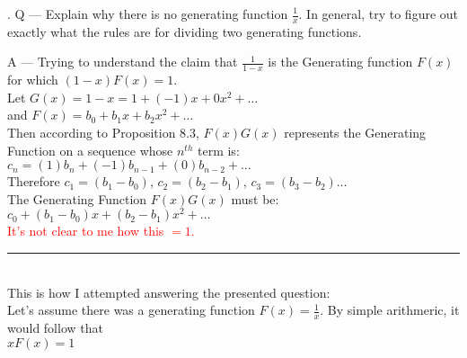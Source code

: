 \documentclass{article}
\newcounter{question}
\begin{document}
\newcommand\Que[1]{%
   \leavevmode\par
   \stepcounter{question}
   \noindent
   \thequestion. Q --- #1\par}

\newcommand\Ans[2][]{%
    \leavevmode\par\noindent
   {\leftskip37pt
    A --- \textbf{#1}#2\par}}

\Que{
    Explain why there is no generating function $ \frac{1}{x} $. 
    In general, try to figure out exactly what the rules are 
    for dividing two generating functions.
    }
\Ans{
    Trying to understand the claim  that $\frac{1}{1-x}$
    is the Generating function $F(x)$ for which $(1-x)F(x)=1$.\\

    Let $G(x) = 1-x = 1 + (-1)x + 0x^2 + \dots$\\
    
    and $F(x) = b_0 + b_1x + b_2x^2 + \dots$\\

    Then according to Proposition $8.3$, $ F(x)G(x) $
    represents the Generating Function on a sequence
    whose $n^{th}$ term is:\\

    $
    c_n = (1)b_n + (-1)b_{n-1} + (0)b_{n-2} + \dots
    $\\

    Therefore $c_1 = (b_1 - b_0)$, 
    $c_2 = (b_2 - b_1)$,
    $c_3 = (b_3 - b_2)\dots$\\

    The Generating Function $ F(x)G(x) $ must be:\\

    $
    c_0 + (b_1 - b_0)x + (b_2 - b_1)x^2 + \dots
    $\\

    \textcolor{red}{It's not clear to me how this $=1$.}\\

    \noindent\rule{11cm}{0.4pt}\\

    This is how I attempted answering the presented question:\\
    
    Let's assume there was a generating function $ F(x) = \frac{1}{x} $.
    By simple arithmeric, it would follow that\\

    $
    xF(x) = 1
    $\\

}
\end{document}
